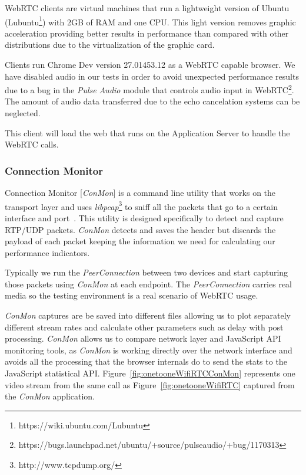 WebRTC clients are virtual machines that run a lightweight version of Ubuntu (Lubuntu\footnote{https://wiki.ubuntu.com/Lubuntu}) with 2GB of RAM and one CPU. This light version removes graphic acceleration providing better results in performance than compared with other distributions due to the virtualization of the graphic card. 

Clients run Chrome Dev version 27.01453.12 as a WebRTC capable browser. We have disabled audio in our tests in order to avoid unexpected performance results due to a bug in the {\it Pulse Audio} module that controls audio input in WebRTC\footnote{https://bugs.launchpad.net/ubuntu/+source/pulseaudio/+bug/1170313}. The amount of audio data transferred due to the echo cancelation systems can be neglected.

This client will load the web that runs on the Application Server to handle the WebRTC calls.

\subsubsection{Connection Monitor}

Connection Monitor [{\it ConMon}] is a command line utility that works on the transport layer and uses {\it libpcap}\footnote{http://www.tcpdump.org/} to sniff all the packets that go to a certain interface and port~\cite{singhConMon}. This utility is designed specifically to detect and capture RTP/UDP packets. {\it ConMon} detects and saves the header but discards the payload of each packet keeping the information we need for calculating our performance indicators.

Typically we run the {\it PeerConnection} between two devices and start capturing those packets using {\it ConMon} at each endpoint. The {\it PeerConnection} carries real media so the testing environment is a real scenario of WebRTC usage.

{\it ConMon} captures are be saved into different files allowing us to plot separately different stream rates and calculate other parameters such as delay with post processing. {\it ConMon} allows us to compare network layer and JavaScript API monitoring tools, as {\it ConMon} is working directly over the network interface and avoids all the processing that the browser internals do to send the stats to the JavaScript statistical API. Figure~\ref{fig:onetooneWifiRTCConMon} represents one video stream from the same call as Figure~\ref{fig:onetooneWifiRTC} captured from the {\it ConMon} application.

